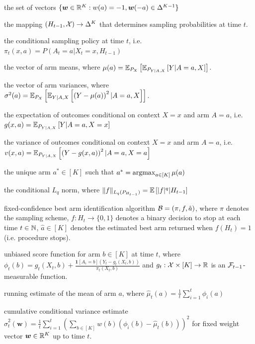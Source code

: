 \documentclass{article}
\begin{document}
\begin{appendices}
\begin{description}[
  leftmargin=2.2cm,
  labelwidth=2cm,
  labelsep=.2cm,
  parsep=0mm,
  itemsep=2pt
  ]
\item[$\Delta(a)$] the set of vectors $\{\boldsymbol{w} \in \mathbb{R}^K: w(a) = -1, \boldsymbol{w}(-a) \in \Delta^{K-1}\}$
\item[$\pi$] the mapping $(H_{t-1}, \mathcal{X}) \rightarrow \Delta^K$ that determines sampling probabilities at time $t$.
\item[$\pi_t$] the conditional sampling policy at time $t$, i.e. $\pi_t(x,a) = P(A_t = a| X_t = x, H_{t-1})$
\item[$\bm\mu$] the vector of arm means, where $\mu(a)= \mathbb{E}_{P_X}\left[ \mathbb{E}_{P_{Y|A,X}}\left[Y| A= a, X\right] \right]$.
\item[$\bm\sigma^2$] the vector of arm variances, where $\sigma^2(a) = \mathbb{E}_{P_X}\left[\mathbb{E}_{Y|A,X}\left[\left(Y - \mu(a) \right)^2 | A=a, X \right] \right]$.
\item[$g(x,a)$] the expectation of outcomes conditional on context $X=x$ and arm $A=a$, i.e. $g(x,a) = \mathbb{E}_{P_{Y|A,X}}\left[Y | A=a, X=x\right]$
\item[$v(x,a)$] the variance of outcomes conditional on context $X=x$ and arm $A=a$, i.e. $v(x,a) = \mathbb{E}_{P_{Y|A,X}}\left[ \left(Y - g(x,a)\right)^2 | A=a, X=a\right]$
\item [$a^*$] the unique arm $a^* \in [K]$ such that $a^* = \argmax_{a \in [K]}\mu(a)$
\item[$\|f \|_{L_q(P_{H_{t-1}})}$] the conditional $L_q$ norm, where $\|f \|_{L_q(P_{H_{t-1}})} = \mathbb{E}\left[ |f|^q | H_{t-1} \right]$ 
\item[$\Bcal$] fixed-confidence best arm identification algorithm $\mathcal{B} = (\pi, f, \hat{a})$, where $\pi$ denotes the sampling scheme, $f: H_t \rightarrow \{0,1\}$ denotes a binary decision to stop at each time $t \in \mathbb{N}$, $\hat{a} \in [K]$ denotes the estimated best arm returned when $f(H_t) = 1$ (i.e. procedure stops). 
\item[$\phi_t(b)$] unbiased score function for arm $b \in [K]$ at time $t$, where $\phi_t(b) = g_t(X_t, b) + \frac{\mathbf{1}[A_i = b](Y_t - g_t(X_t, b))}{\pi_t(X_t, b)}$ and $g_t: \mathcal{X} \times [K] \rightarrow \mathbb{R}$ is an $\mathcal{F}_{t-1}$-measurable function. 
\item [$\hat\mu_t(a)$] running estimate of the mean of arm $a$, where $\hat\mu_t(a) = \frac{1}{t}\sum_{i=1}^t \phi_i(a)$
\item [$\hat\sigma_t^2(\bm{w})$] cumulative conditional variance estimate $\hat{\sigma}_t^2(\bm{w}) = \frac{1}{t}\sum_{i=1}^t \left( \sum_{b\in [K]} w(b)\left(\phi_i(b) - \hat\mu_t(b)\right) \right)^2$ for fixed weight vector $\boldsymbol{w} \in \mathbb{R}^K$ up to time $t$. 

\end{description}
\end{appendices}
\end{document}
